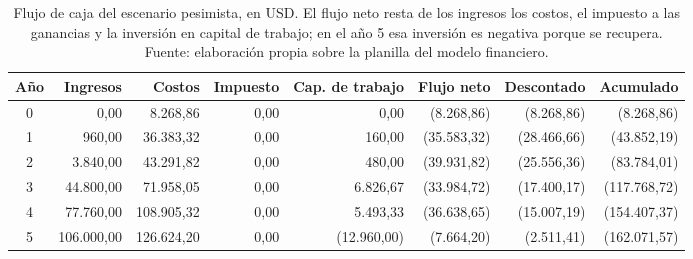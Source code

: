 \begin{table}[t]
  \centering
  \footnotesize\setlength{\tabcolsep}{3.5pt}
  \caption{Flujo de caja del escenario pesimista, en USD. El flujo neto resta de los ingresos los costos, el impuesto a las ganancias y la inversión en capital de trabajo; en el año 5 esa inversión es negativa porque se recupera. Fuente: elaboración propia sobre la planilla del modelo financiero.}
  \label{tab:financiero-pesimista-flujo}
  \begin{tabular}{c r r r r r r r}
    \hline
    \textbf{Año} & \textbf{Ingresos} & \textbf{Costos} & \textbf{Impuesto} & \textbf{Cap. de trabajo} & \textbf{Flujo neto} & \textbf{Descontado} & \textbf{Acumulado} \\
    \hline
    0 & 0,00 & 8.268,86 & 0,00 & 0,00 & (8.268,86) & (8.268,86) & (8.268,86) \\
    1 & 960,00 & 36.383,32 & 0,00 & 160,00 & (35.583,32) & (28.466,66) & (43.852,19) \\
    2 & 3.840,00 & 43.291,82 & 0,00 & 480,00 & (39.931,82) & (25.556,36) & (83.784,01) \\
    3 & 44.800,00 & 71.958,05 & 0,00 & 6.826,67 & (33.984,72) & (17.400,17) & (117.768,72) \\
    4 & 77.760,00 & 108.905,32 & 0,00 & 5.493,33 & (36.638,65) & (15.007,19) & (154.407,37) \\
    5 & 106.000,00 & 126.624,20 & 0,00 & (12.960,00) & (7.664,20) & (2.511,41) & (162.071,57) \\
    \hline
  \end{tabular}
\end{table}
